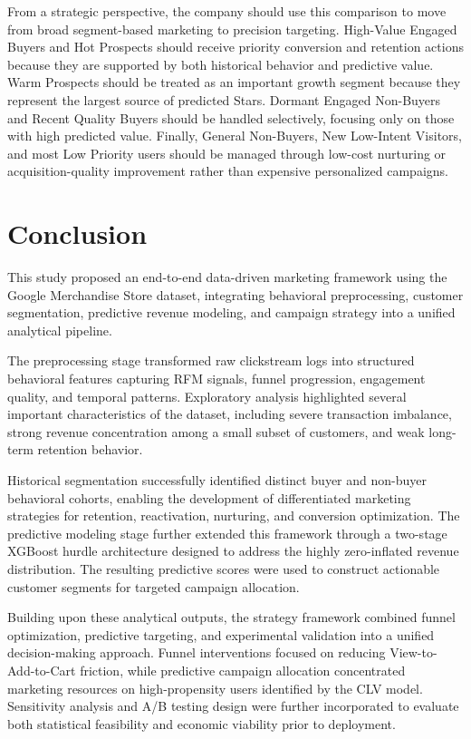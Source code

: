 \documentclass[conference]{IEEEtran}
\begin{document}
From a strategic perspective, the company should use this comparison to move from broad segment-based marketing to precision targeting. High-Value Engaged Buyers and Hot Prospects should receive priority conversion and retention actions because they are supported by both historical behavior and predictive value. Warm Prospects should be treated as an important growth segment because they represent the largest source of predicted Stars. Dormant Engaged Non-Buyers and Recent Quality Buyers should be handled selectively, focusing only on those with high predicted value. Finally, General Non-Buyers, New Low-Intent Visitors, and most Low Priority users should be managed through low-cost nurturing or acquisition-quality improvement rather than expensive personalized campaigns.



\section{Conclusion}

This study proposed an end-to-end data-driven marketing
framework using the Google Merchandise Store dataset,
integrating behavioral preprocessing, customer segmentation,
predictive revenue modeling, and campaign strategy into a
unified analytical pipeline.

The preprocessing stage transformed raw clickstream logs
into structured behavioral features capturing RFM signals,
funnel progression, engagement quality, and temporal
patterns. Exploratory analysis highlighted several important
characteristics of the dataset, including severe transaction
imbalance, strong revenue concentration among a small subset
of customers, and weak long-term retention behavior.

Historical segmentation successfully identified distinct
buyer and non-buyer behavioral cohorts, enabling the
development of differentiated marketing strategies for
retention, reactivation, nurturing, and conversion
optimization. The predictive modeling stage further extended
this framework through a two-stage XGBoost hurdle
architecture designed to address the highly zero-inflated
revenue distribution. The resulting predictive scores were
used to construct actionable customer segments for targeted
campaign allocation.

Building upon these analytical outputs, the strategy
framework combined funnel optimization, predictive targeting,
and experimental validation into a unified decision-making
approach. Funnel interventions focused on reducing
View-to-Add-to-Cart friction, while predictive campaign
allocation concentrated marketing resources on
high-propensity users identified by the CLV model.
Sensitivity analysis and A/B testing design were further
incorporated to evaluate both statistical feasibility and
economic viability prior to deployment.
\end{document}
